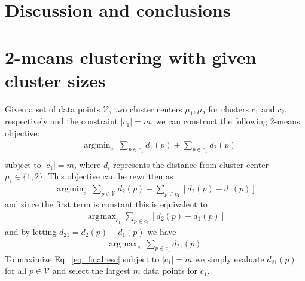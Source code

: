 \documentclass{article}
\numberwithin{equation}{section}
\numberwithin{thm}{section}
\DeclareMathOperator*{\argmin}{\arg\!\min}
\DeclareMathOperator*{\argmax}{\arg\!\max}
\begin{document}
\section{Discussion and conclusions}


\small{

%

}

\appendix
\section{2-means clustering with given cluster sizes}
Given a set of data points $\mathcal{V}$, two cluster centers $\mu_1,\mu_2$ for clusters $c_1$ and $c_2$, respectively and the constraint $|c_1|=m$, we can construct the following 2-means objective:
\begin{align}
& \argmin_{c_1}\sum_{p \in c_1} d_1(p) + \sum_{p \notin c_1} d_2(p) \\
\end{align}
subject to $|c_1|=m$, where $d_i$ represents the distance from cluster center $\mu_i \in \{1,2\}$. This objective can be rewritten as
\begin{align}
 \argmin_{c_1} \sum_{p \in \mathcal{V}} d_2(p) - \sum_{p \in c_1}\left[ d_2(p) - d_1(p) \right]
\end{align}
and since the first term is constant this is equivalent to
\begin{align}
 \argmax_{c_1}\sum_{p \in c_1}\left[ d_2(p) - d_1(p) \right]
\end{align}
and by letting $d_{21} = d_2(p) - d_1(p)$ we have
\begin{align}
\label{eq_finalresc}
 \argmax_{c_1} \sum_{p \in c_1}d_{21}(p).
\end{align}
To maximize Eq.\ \ref{eq_finalresc} subject to $|c_1|=m$ we simply evaluate $d_{21}(p)$ for all $p \in \mathcal{V}$ and select the largest $m$ data points for $c_1$.
\end{document}
